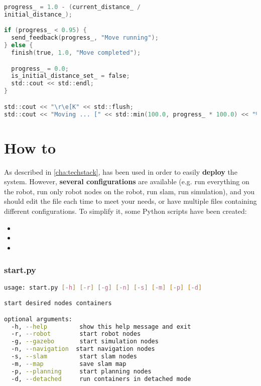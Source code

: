 \noindent\begin{lstlisting}[language=C, style=CStyle, caption={Sends feedback until the goal is reached}]
progress_ = 1.0 - (current_distance_ /
initial_distance_);

if (progress_ < 0.95) {
  send_feedback(progress_, "Move running");
} else {
  finish(true, 1.0, "Move completed");

  progress_ = 0.0;
  is_initial_distance_set_ = false;
  std::cout << std::endl;
}

std::cout << "\r\e[K" << std::flush;
std::cout << "Moving ... [" << std::min(100.0, progress_ * 100.0) << "%]" << std::flush;
  \end{lstlisting}

\chapter{How to}

As described in \autoref{cha:techstack},  has been used in order to easily \textbf{deploy} the system. However, \textbf{several configurations} are available (e.g. run everything on the robot, run only robot nodes on the robot, run \acrshort{slam}, run simulation), and you should edit the  file each time to meet your needs, or have multiple files containing different configurations. To simplify it, some Python scripts have been created:

\begin{itemize}
  \item {}
  \item {}
  \item {}
\end{itemize}

\subsection{start.py}

\begin{lstlisting}[language=bash, style=bashStyle, caption={Generates a \code{docker-compose.yaml} file from a template and runs it}]
usage: start.py [-h] [-r] [-g] [-n] [-s] [-m] [-p] [-d]

start desired nodes containers

optional arguments:
  -h, --help         show this help message and exit
  -r, --robot        start robot nodes
  -g, --gazebo       start simulation nodes
  -n, --navigation  start navigation nodes
  -s, --slam         start slam nodes
  -m, --map          save slam map
  -p, --planning     start planning nodes
  -d, --detached     run containers in detached mode
\end{lstlisting}


